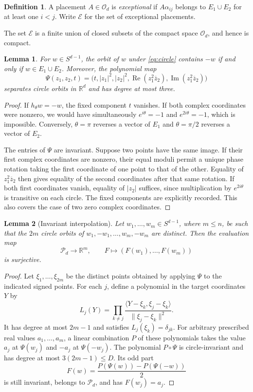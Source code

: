\documentclass[11pt,reqno]{amsart}
\newtheorem{lemma}[lemma]{Lemma}
\theoremstyle{definition}
\newtheorem{definition}[definition]{Definition}
\theoremstyle{remark}
\numberwithin{equation}{section}
\newcommand{\R}{\mathbb R}
\newcommand{\Orth}{\mathcal O_d}
\newcommand{\Pol}{\mathcal P_d}
\newcommand{\Exc}{\mathcal E}
\newcommand{\ip}[2]{\langle #1,#2\rangle}
\newcommand{\norm}[1]{\lVert #1\rVert}
\DeclareMathOperator{\RePart}{Re}
\DeclareMathOperator{\ImPart}{Im}
\begin{document}
\begin{definition}\label{def:exceptional}
A placement $A\in\Orth$ is \emph{exceptional} if $A\alpha_{ij}$
belongs to $E_1\cup E_2$ for at least one $i<j$. Write $\Exc$ for
the set of exceptional placements.
\end{definition}

The set $\Exc$ is a finite union of closed subsets of the compact
space $\Orth$, and hence is compact.

\begin{lemma}\label{lem:orbits}
For $w\in S^{d-1}$, the orbit of $w$ under \eqref{eq:circle} contains
$-w$ if and only if $w\in E_1\cup E_2$.
Moreover, the polynomial map
\begin{equation}\label{eq:orbit-map}
 \Psi(z_1,z_2,t)=
 \bigl(t,|z_1|^2,|z_2|^2,
        \RePart(z_1^2\overline z_2),
        \ImPart(z_1^2\overline z_2)\bigr)
\end{equation}
separates circle orbits in $\R^d$ and has degree at most three.
\end{lemma}
\begin{proof}
If $h_\theta w=-w$, the fixed component $t$ vanishes. If both complex
coordinates were nonzero, we would have simultaneously
$e^{i\theta}=-1$ and $e^{2i\theta}=-1$, which is impossible.
Conversely, $\theta=\pi$ reverses a vector of $E_1$ and
$\theta=\pi/2$ reverses a vector of $E_2$.

The entries of $\Psi$ are invariant. Suppose two points have the same
image. If their first complex coordinates are nonzero, their equal
moduli permit a unique phase rotation taking the first coordinate of
one point to that of the other. Equality of $z_1^2\overline z_2$
then gives equality of the second coordinates after that same
rotation. If both first coordinates vanish, equality of $|z_2|$
suffices, since multiplication by $e^{2i\theta}$ is transitive on
each circle. The fixed components are explicitly recorded. This
also covers the case of two zero complex coordinates.
\end{proof}

\begin{lemma}[Invariant interpolation]\label{lem:interpolation}
Let $w_1,\ldots,w_m\in S^{d-1}$, where $m\leq n$, be such that
the $2m$ circle orbits of $w_1,-w_1,\ldots,w_m,-w_m$ are distinct.
Then the evaluation map
\[
 \Pol\longrightarrow\R^m,\qquad
 F\longmapsto(F(w_1),\ldots,F(w_m))
\]
is surjective.
\end{lemma}
\begin{proof}
Let $\xi_1,\ldots,\xi_{2m}$ be the distinct points obtained by applying
$\Psi$ to the indicated signed points. For each $j$, define a polynomial
in the target coordinates $Y$ by
\[
 L_j(Y)=\prod_{k\ne j}
  \frac{\ip{Y-\xi_k}{\xi_j-\xi_k}}{\norm{\xi_j-\xi_k}^2}.
\]
It has degree at most $2m-1$ and satisfies $L_j(\xi_k)=\delta_{jk}$.
For arbitrary prescribed real values $a_1,\ldots,a_m$, a linear
combination $P$ of these polynomials takes the value $a_j$ at
$\Psi(w_j)$ and $-a_j$ at $\Psi(-w_j)$.
The polynomial $P\circ\Psi$ is circle-invariant and has degree
at most $3(2m-1)\leq D$. Its odd part
\[
 F(w)=\frac{P(\Psi(w))-P(\Psi(-w))}{2}
\]
is still invariant, belongs to $\Pol$, and has $F(w_j)=a_j$.
\end{proof}
\end{document}
